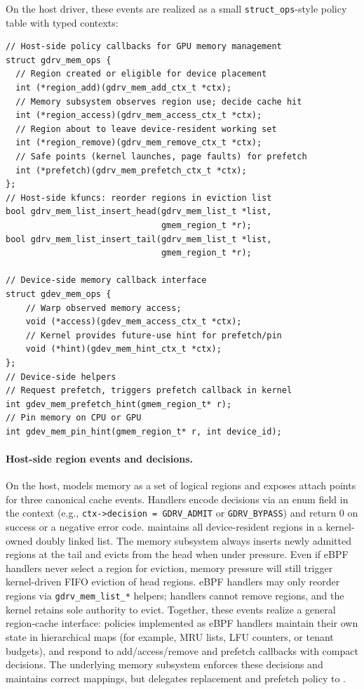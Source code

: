 On the host driver, these events are realized as a small \texttt{struct\_ops}-style policy
table with typed contexts:

\begin{verbatim}
// Host-side policy callbacks for GPU memory management
struct gdrv_mem_ops {
  // Region created or eligible for device placement
  int (*region_add)(gdrv_mem_add_ctx_t *ctx);
  // Memory subsystem observes region use; decide cache hit
  int (*region_access)(gdrv_mem_access_ctx_t *ctx);
  // Region about to leave device-resident working set
  int (*region_remove)(gdrv_mem_remove_ctx_t *ctx);
  // Safe points (kernel launches, page faults) for prefetch
  int (*prefetch)(gdrv_mem_prefetch_ctx_t *ctx);
};
// Host-side kfuncs: reorder regions in eviction list
bool gdrv_mem_list_insert_head(gdrv_mem_list_t *list,
                               gmem_region_t *r);
bool gdrv_mem_list_insert_tail(gdrv_mem_list_t *list,
                               gmem_region_t *r);

// Device-side memory callback interface
struct gdev_mem_ops {
    // Warp observed memory access;
    void (*access)(gdev_mem_access_ctx_t *ctx);
    // Kernel provides future-use hint for prefetch/pin
    void (*hint)(gdev_mem_hint_ctx_t *ctx);
};
// Device-side helpers
// Request prefetch, triggers prefetch callback in kernel
int gdev_mem_prefetch_hint(gmem_region_t* r);
// Pin memory on CPU or GPU
int gdev_mem_pin_hint(gmem_region_t* r, int device_id);
\end{verbatim}

\paragraph{Host-side region events and decisions.}
On the host, \sys models memory as a set of logical regions and exposes attach points for three
canonical cache events. Handlers encode decisions via an enum field in the context (e.g., \texttt{ctx->decision = GDRV\_ADMIT} or \texttt{GDRV\_BYPASS}) and return 0 on success or a negative error code. \sys maintains all device-resident regions in a kernel-owned doubly linked list. The memory subsystem always inserts newly admitted regions at the tail and evicts from the head when under pressure. Even if eBPF handlers never select a region for eviction, memory pressure will still trigger kernel-driven FIFO eviction of head regions. eBPF handlers may only reorder regions via \texttt{gdrv\_mem\_list\_*} helpers; handlers cannot remove regions, and the kernel retains sole authority to evict. Together, these events realize a
general region-cache interface: policies implemented as eBPF handlers maintain their
own state in hierarchical maps (for example, MRU lists, LFU counters, or tenant budgets),
and respond to add/access/remove and prefetch callbacks with compact decisions. The underlying memory subsystem enforces these decisions
and maintains correct mappings, but delegates replacement and prefetch policy to
\sys.

